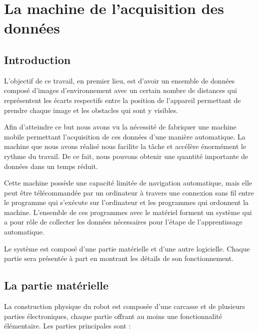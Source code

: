 \chapter{La machine de l'acquisition des données}

\section{Introduction}

L'objectif de ce travail, en premier lieu, est d'avoir un ensemble de données
composé d'images d'environnement avec un certain nombre de distances qui
représentent  les écarts respectifs entre la position de l'appareil permettant
de prendre chaque image et les obstacles qui sont y visibles.

Afin d'atteindre ce but nous avons vu la nécessité de fabriquer une machine mobile
permettant l'acquisition de ces données d'une manière automatique. La machine que
nous avons réalisé nous facilite la tâche et accélère énormément le rythme du travail.
De ce fait, nous pouvons obtenir une quantité importante de données dans un temps
réduit.

Cette machine possède une capacité limitée de navigation automatique, mais
elle peut être télécommandée par un ordinateur à travers une connexion sans fil
entre le programme qui s'exécute sur l'ordinateur et les programmes qui ordonnent
la machine. L'ensemble de ces programmes avec le matériel forment un système
qui a pour rôle de collecter les données nécessaires pour l'étape de
l'apprentissage automatique.

Le système est composé d'une partie matérielle et d'une autre logicielle. Chaque
partie sera présentée à part en montrant les détails de son fonctionnement.

\section{La partie matérielle}

La construction physique du robot est composée d'une carcasse et de plusieurs
parties électroniques, chaque partie offrant au moins une fonctionnalité
élémentaire. Les parties principales sont :

